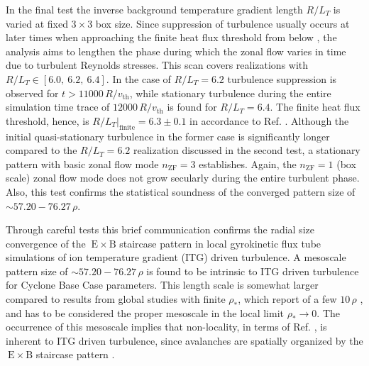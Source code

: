 \documentclass[aip, amsmath, amssymb, reprint, twocolumn, floatfix]{revtex4-1}
\newcommand{\exb}{\mathrm{\:E}\times\mathrm{B}}
\newcommand{\rlt}{R/L_T}
\newcommand{\rhoth}{\rho}
\newcommand{\vth}{v_{\mathrm{th}}}
\newcommand{\nzf}{n_\mathrm{ZF}}
\begin{document}
In the final test the inverse background temperature gradient length $\rlt$ is varied at fixed $3\times3$ box size.
Since suppression of turbulence usually occurs at later times when approaching the finite heat flux threshold from below \cite{Peeters2016}, the analysis aims to lengthen the phase during which the zonal flow varies in time due to turbulent Reynolds stresses.
This scan covers realizations with $\rlt \in [6.0,~6.2,~6.4]$.
In the case of $\rlt = 6.2$ turbulence suppression is observed for $t > 11000\,R/\vth$, while stationary turbulence during the entire simulation time trace of $12000\,R/\vth$ is found for $\rlt = 6.4$.
The finite heat flux threshold, hence, is $\rlt|_\mathrm{finite} = 6.3 \pm 0.1$ in accordance to Ref. .
Although the initial quasi-stationary turbulence in the former case is significantly longer compared to the $\rlt = 6.2$ realization discussed in the second test, a stationary pattern with basic zonal flow mode $\nzf = 3$ establishes. 
Again, the $\nzf = 1$ (box scale) zonal flow mode does not grow secularly during the entire turbulent phase.
Also, this test confirms the statistical soundness of the converged pattern size of $\sim 57.20 - 76.27\,\rhoth$.\\

\bigskip
\bigskip
\bigskip



Through careful tests this brief communication confirms the radial size convergence of the $\exb$ staircase pattern in local gyrokinetic flux tube simulations of ion temperature gradient (ITG) driven turbulence.
A mesoscale pattern size of $\sim 57.20 - 76.27\,\rhoth$ is found to be intrinsic to ITG driven turbulence for Cyclone Base Case parameters.
This length scale is somewhat larger compared to results from global studies with finite $\rho_\ast$, which report of a few $10\,\rhoth$ \cite{Pradalier2010}, and has to be considered the proper mesoscale in the local limit $\rho_\ast \rightarrow 0$.  
The occurrence of this mesoscale implies that non-locality, in terms of Ref. , is inherent to ITG driven turbulence, since avalanches are spatially organized by the $\exb$ staircase pattern \cite{McMillan2009, Pradalier2010, Rath2016, Peeters2016}. 
\end{document}
